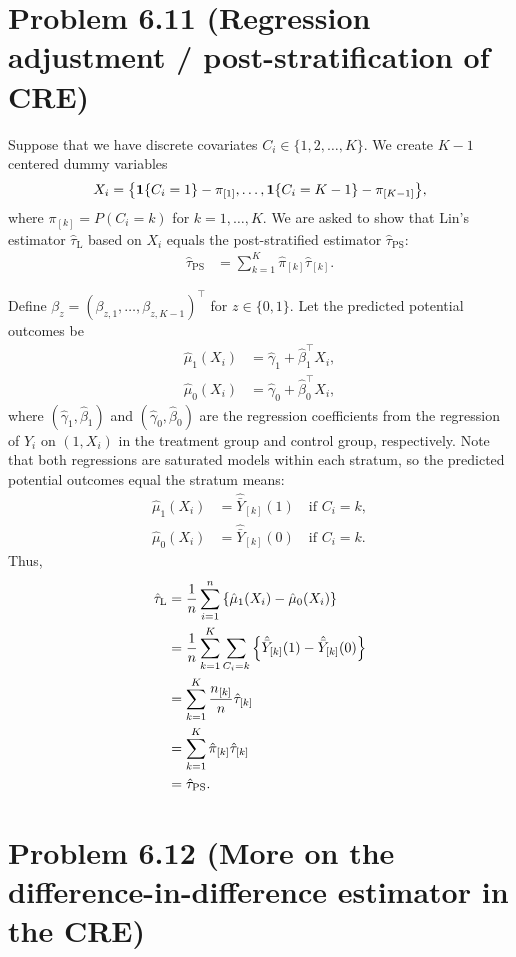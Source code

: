 \documentclass[10pt]{article}
\begin{document}
\section*{Problem 6.11 (Regression adjustment / post-stratification of CRE)}

Suppose that we have discrete covariates $C_i \in \{1, 2, \ldots, K\}$.
We create $K - 1$ centered dummy variables
\begin{align*}
  X_{i} = {\left\lbrace \mathbf{1}\{C_i = 1\} - \pi_{[1]}, \ldots, \mathbf{1}\{C_i = K - 1\} - \pi_{[K - 1]} \right\rbrace},
\end{align*}
where $\pi_{[k]} = P(C_i = k)$ for $k = 1, \ldots, K$.
We are asked to show that Lin's estimator $\hat{\tau}_{\text{L}}$
based on $X_i$ equals the post-stratified estimator $\hat{\tau}_{\text{PS}}$:
\begin{align*}
  \hat{\tau}_{\text{PS}}
  &= \sum_{k=1}^K \hat{\pi}_{[k]} \hat{\tau}_{[k]}.
\end{align*}

Define $\beta_z = (\beta_{z, 1}, \ldots, \beta_{z, K - 1})^\intercal$ for $z \in \{0, 1\}$.
Let the predicted potential outcomes be
\begin{align*}
  \hat{\mu}_1(X_i) &= \hat{\gamma}_1 + \hat{\beta}_1^\intercal X_i, \\
  \hat{\mu}_0(X_i) &= \hat{\gamma}_0 + \hat{\beta}_0^\intercal X_i,
\end{align*}
where $(\hat{\gamma}_1, \hat{\beta}_1)$ and $(\hat{\gamma}_0, \hat{\beta}_0)$
are the regression coefficients from the regression of $Y_i$ on $(1, X_i)$
in the treatment group and control group, respectively.
Note that both regressions are saturated models within each stratum,
so the predicted potential outcomes equal the stratum means:
\begin{align*}
  \hat{\mu}_1(X_i) 
  &= \hat{\bar{Y}}_{[k]}(1) \quad \text{if } C_i = k, \\
  \hat{\mu}_0(X_i)
  &= \hat{\bar{Y}}_{[k]}(0) \quad \text{if } C_i = k.
\end{align*}
Thus,
\begin{align*}
  \hat{\tau}_{\text{L}}
  &= \frac{1}{n} \sum_{i=1}^n {\left\lbrace \hat{\mu}_1(X_i) - \hat{\mu}_0(X_i) \right\rbrace} \\
  &= \frac{1}{n} \sum_{k=1}^K \sum_{C_i = k} 
  {\left\lbrace \hat{\bar{Y}}_{[k]}(1) - \hat{\bar{Y}}_{[k]}(0) \right\rbrace} \\
  &= \sum_{k=1}^K \frac{n_{[k]}}{n} \hat{\tau}_{[k]} \\
  &= \sum_{k=1}^K \hat{\pi}_{[k]} \hat{\tau}_{[k]} \\
  &= \hat{\tau}_{\text{PS}}.
\end{align*}

\section*{Problem 6.12 (More on the difference-in-difference estimator in the CRE)}

\printglossaries
\end{document}
